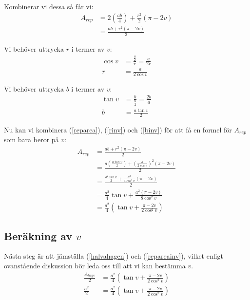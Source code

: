 \documentclass[10pt]{article}
\begin{document}
  Kombinerar vi dessa så får vi:
  \begin{align}
    A_{rep} &= 2\left(\frac{ab}{4}\right) + \frac{r^2}{2}(\pi-2v) \nonumber \\
    &= \frac {ab + r^2(\pi-2v)}{2} \label{reparea}
  \end{align}

  Vi behöver uttrycka $r$ i termer av $v$:
  \begin{align}
    \cos v &= \frac{\frac{a}{2}}{r} = \frac{a}{2r} \\
    r &= \frac{a}{2 \cos v} \label{rinv}
  \end{align}

  Vi behöver uttrycka $b$ i termer av $v$:
  \begin{align}
    \tan v &= \frac{b}{\frac{a}{2}} = \frac{2b}{a} \\
    b &= \frac{a \tan v}{2} \label{binv}
  \end{align}

  Nu kan vi kombinera (\ref{reparea}), (\ref{rinv}) och (\ref{binv}) för att få en formel för $A_{rep}$ som bara beror på $v$:
  \begin{align}
    A_{rep} &= \frac {ab + r^2(\pi-2v)}{2} \label{repareainbrv} \\
    &= \frac{a(\frac{a \tan v}{2}) + (\frac{a}{2 \cos v})^2(\pi-2v)}{2} \nonumber \\
    &= \frac{\frac{a^2 \tan v}{2} + \frac{a^2}{4 \cos^2 v}(\pi-2v)}{2} \nonumber \\
    &= \frac{a^2}{4} \tan v + \frac{a^2(\pi-2v)}{8 \cos^2 v} \nonumber \\
    &= \frac{a^2}{4} \left( \tan v + \frac{\pi-2v}{2 \cos^2 v} \right) \label{repareainv}
  \end{align}

  \subsection*{Beräkning av $v$}

  Nästa steg är att jämställa (\ref{halvahagen}) och (\ref{repareainv}), vilket enligt ovanstående diskussion bör leda oss till att vi kan bestämma $v$.
  \begin{align}
    \frac{A_{hage}}{2} &= \frac{a^2}{4} \left( \tan v + \frac{\pi-2v}{2 \cos^2 v} \right) \nonumber \\
    \frac{a^2}{2} &= \frac{a^2}{4} \left( \tan v + \frac{\pi-2v}{2 \cos^2 v} \right) \label{getsridofa}
  \end{align}
\end{document}
